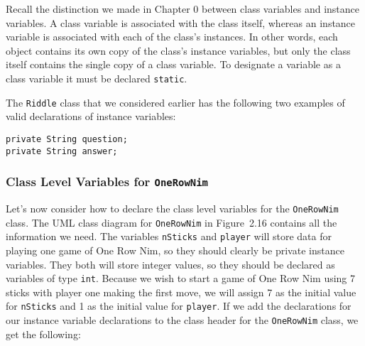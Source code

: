 Recall the distinction we made in Chapter 0 between class variables
and instance variables. A class variable is associated with the class
itself, whereas an instance variable is associated with each of the
class's instances.  In other words, each object contains its own copy
of the class's instance variables, but only the class itself contains
the single copy of a class variable.  To designate a variable as a
class variable it must be declared {\tt static}.

The {\tt Riddle} class that we considered earlier has the following
two examples of valid declarations of instance variables:

\begin{jjjlisting}
\begin{lstlisting}
private String question;
private String answer;
\end{lstlisting}
\end{jjjlisting}


\subsubsection*{Class Level Variables for {\tt OneRowNim}}

\noindent Let's now consider how to declare the class
level variables for the {\tt OneRowNim} class.  The UML class diagram
for {\tt OneRowNim} in Figure~2.16 contains all the
information we need.  The variables {\tt nSticks} and {\tt player}
will store data for playing one game of One Row Nim, so they should
clearly be private instance variables.  They both will store integer
values, so they should be declared as variables of type {\tt int}.
Because we wish to start a game of One Row Nim using 7 sticks with
player one making the first move, we will assign 7 as the initial
value for {\tt nSticks} and 1 as the initial value for {\tt player}.
If we add the declarations for our instance variable declarations to
the class header for the {\tt OneRowNim} class, we get the following:



